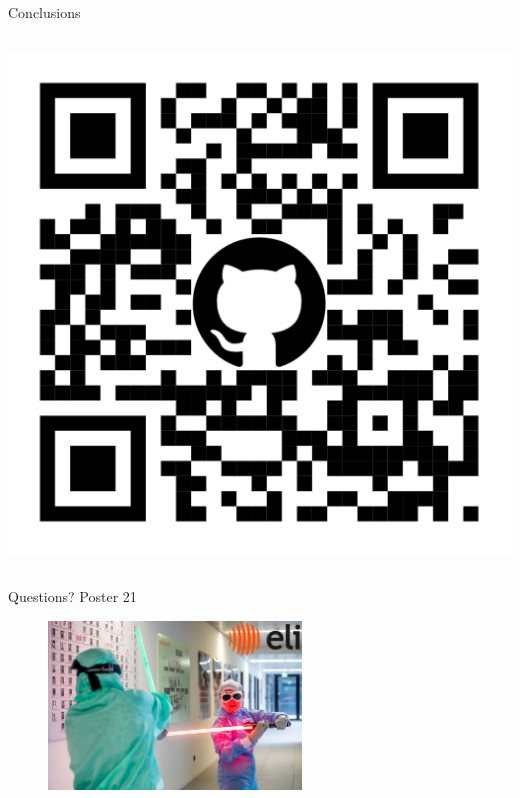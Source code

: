 \documentclass{beamer}
\newcommand{\notebox}[1]{\colorbox{myprimary!30}{#1}}
\begin{document}
\begin{frame}{Conclusions}
\begin{columns}
\begin{column}{0.3\textwidth}
        \includegraphics[width=\linewidth]{images/env-qr.png}
    \end{column}
\end{columns}

\end{frame}
\begin{frame}
    Questions? \notebox{Poster 21}
    \begin{figure}
        \includegraphics[width=0.6\textwidth]{images/sabers.jpg}
    \end{figure}
\end{frame}
\end{document}

